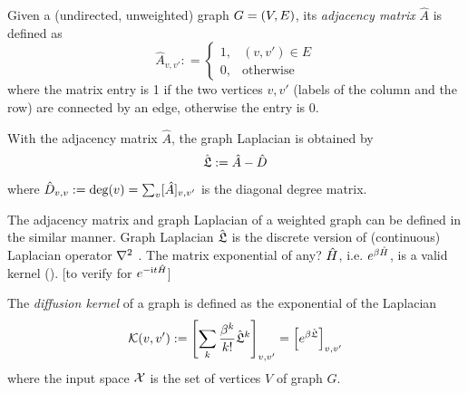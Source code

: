 \begin{definition}\label{def:adjacency_matrix}
	Given a (undirected, unweighted) graph $G=(V,E)$, its \emph{adjacency matrix} $\hat{A}$ is defined as
	\begin{equation}
		\hat{A}_{v,v'} : = 
		\begin{cases}
			1, & (v,v') \in E \\
			0, & \text{otherwise}
		\end{cases}
	\end{equation}
	where the matrix entry is 1 if the two vertices $v,v'$ (labels of the column and the row) are connected by an edge, otherwise the entry is 0.
\end{definition}
\begin{definition}\label{def:graph_laplacian}
	With the adjacency matrix $\hat{A}$, the graph Laplacian is obtained by
	\begin{equation}
		\hat{\mathfrak{L}}:=\hat{A}-\hat{D}	
	\end{equation}
	where $\hat{D}_{v,v}:=\textup{deg}(v)=\sum_{v}[\hat{A}]_{v,v'}$ is the diagonal degree matrix.
\end{definition}
\begin{remark}
The adjacency matrix and graph Laplacian of a weighted graph can be defined in the similar manner.
	Graph Laplacian $\hat{\mathfrak{L}}$ is the 
	discrete version of (continuous) Laplacian operator $\laplacian$
	\cite{chungSpectralGraphTheory1997}.
	The matrix exponential of any? $\hat{H}$, i.e. $e^{\beta \hat{H}}$, is a valid kernel (\psd). [to verify for $e^{-\textup{i} t\hat{H}}$]
\end{remark}
\begin{definition}\label{def:diffusion_kernel}
	The \emph{diffusion kernel} of a graph is defined as the exponential of the Laplacian
	\begin{equation}
		\mathcal{K}(v,v') := 
		\qty[\sum_{k}\frac{\beta^k}{k!}\hat{\mathfrak{L}}^k]_{v,v'}  =
		\qty[e^{\beta \hat{\mathfrak{L}}}]_{v,v'} 
	\end{equation}
	where the input space $\mathcal{X}$ is the set of vertices $V$ of graph $G$.
\end{definition}

